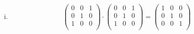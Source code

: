 \documentclass{article}
\begin{document}
\begin{enumerate}[(i)]
\item
  \[
    \left(
      \begin{array}{ccc}
        0 & 0 & 1 \\
        0 & 1 & 0 \\
        1 & 0 & 0 \\
      \end{array}
    \right)
    \cdot
    \left(
      \begin{array}{ccc}
        0 & 0 & 1 \\
        0 & 1 & 0 \\
        1 & 0 & 0 \\
      \end{array}
    \right)
    =
    \left(
      \begin{array}{ccc}
        1 & 0 & 0 \\
        0 & 1 & 0 \\
        0 & 0 & 1 \\
      \end{array}
    \right)
  \]
  
\end{enumerate}
\end{document}
